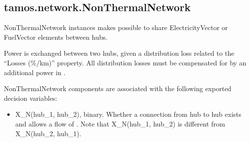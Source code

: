\documentclass[letterpaper,10pt,english]{sphinxmanual}
\begin{document}
\sphinxstepscope


\subsection{tamos.network.NonThermalNetwork}
\label{\detokenize{generated/tamos.network.NonThermalNetwork:tamos-network-nonthermalnetwork}}\label{\detokenize{generated/tamos.network.NonThermalNetwork::doc}}

\begin{fulllineitems}
\label{\detokenize{generated/tamos.network.NonThermalNetwork:tamos.network.NonThermalNetwork}}
\pysigstartsignatures
{}
\pysigstopsignatures{}

\begin{fulllineitems}
\label{\detokenize{generated/tamos.network.NonThermalNetwork:tamos.network.NonThermalNetwork.__init__}}
\pysigstartsignatures
{}
\pysigstopsignatures
\sphinxAtStartPar
NonThermalNetwork instances makes possible to share ElectricityVector or FuelVector elements between hubs.

\sphinxAtStartPar
Power is exchanged between two hubs, given a distribution loss related to the “Losses (\%/km)” property.
All distribution losses must be compensated for by an additional power in .

\sphinxAtStartPar
NonThermalNetwork components are associated with the following exported decision variables:
\begin{itemize}
\item {} 
\sphinxAtStartPar
X\_N(hub\_1, hub\_2), binary.
Whether a connection from hub  to hub  exists and allows a flow of .
Note that X\_N(hub\_1, hub\_2) is different from X\_N(hub\_2, hub\_1).


\end{itemize}
\end{fulllineitems}
\end{fulllineitems}
\end{document}
